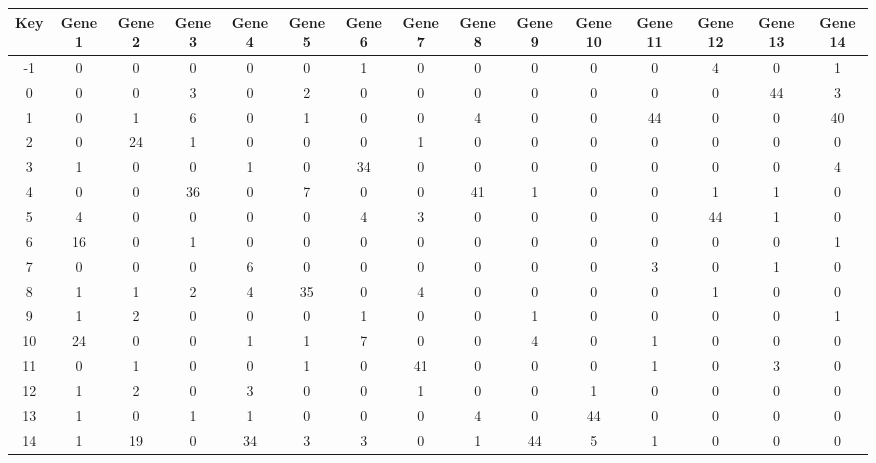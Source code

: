 \begin{tabular}{|c|c|c|c|c|c|c|c|c|c|c|c|c|c|c|}
\hline
Key & Gene 1 & Gene 2 & Gene 3 & Gene 4 & Gene 5 & Gene 6 & Gene 7 & Gene 8 & Gene 9 & Gene 10 & Gene 11 & Gene 12 & Gene 13 & Gene 14 \\
\hline
-1 & 0 & 0 & 0 & 0 & 0 & 1 & 0 & 0 & 0 & 0 & 0 & 4 & 0 & 1 \\
0 & 0 & 0 & 3 & 0 & 2 & 0 & 0 & 0 & 0 & 0 & 0 & 0 & 44 & 3 \\
1 & 0 & 1 & 6 & 0 & 1 & 0 & 0 & 4 & 0 & 0 & 44 & 0 & 0 & 40 \\
2 & 0 & 24 & 1 & 0 & 0 & 0 & 1 & 0 & 0 & 0 & 0 & 0 & 0 & 0 \\
3 & 1 & 0 & 0 & 1 & 0 & 34 & 0 & 0 & 0 & 0 & 0 & 0 & 0 & 4 \\
4 & 0 & 0 & 36 & 0 & 7 & 0 & 0 & 41 & 1 & 0 & 0 & 1 & 1 & 0 \\
5 & 4 & 0 & 0 & 0 & 0 & 4 & 3 & 0 & 0 & 0 & 0 & 44 & 1 & 0 \\
6 & 16 & 0 & 1 & 0 & 0 & 0 & 0 & 0 & 0 & 0 & 0 & 0 & 0 & 1 \\
7 & 0 & 0 & 0 & 6 & 0 & 0 & 0 & 0 & 0 & 0 & 3 & 0 & 1 & 0 \\
8 & 1 & 1 & 2 & 4 & 35 & 0 & 4 & 0 & 0 & 0 & 0 & 1 & 0 & 0 \\
9 & 1 & 2 & 0 & 0 & 0 & 1 & 0 & 0 & 1 & 0 & 0 & 0 & 0 & 1 \\
10 & 24 & 0 & 0 & 1 & 1 & 7 & 0 & 0 & 4 & 0 & 1 & 0 & 0 & 0 \\
11 & 0 & 1 & 0 & 0 & 1 & 0 & 41 & 0 & 0 & 0 & 1 & 0 & 3 & 0 \\
12 & 1 & 2 & 0 & 3 & 0 & 0 & 1 & 0 & 0 & 1 & 0 & 0 & 0 & 0 \\
13 & 1 & 0 & 1 & 1 & 0 & 0 & 0 & 4 & 0 & 44 & 0 & 0 & 0 & 0 \\
14 & 1 & 19 & 0 & 34 & 3 & 3 & 0 & 1 & 44 & 5 & 1 & 0 & 0 & 0 \\
\hline
\end{tabular}